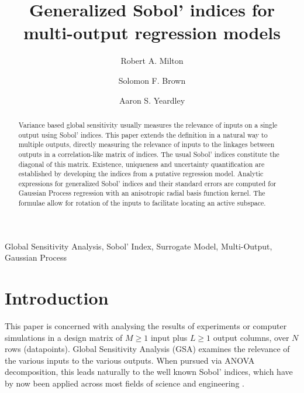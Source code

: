 \documentclass[preprint,12pt]{elsarticle}
\begin{document}
\begin{frontmatter}

    \title{Generalized Sobol' indices for multi-output regression models}

    \author{Robert A. Milton}

    \author{Solomon F. Brown}

    \author{Aaron S. Yeardley}

    \address{Department of Chemical and Biological Engineering, University of Sheffield, Sheffield, S1 3JD, United Kingdom}       

    \begin{abstract}
        Variance based global sensitivity usually measures the relevance of inputs on a single output using Sobol' indices. This paper extends the definition in a natural way to multiple outputs, directly measuring the relevance of inputs to the linkages between outputs in a correlation-like matrix of indices. The usual Sobol' indices constitute the diagonal of this matrix. Existence, uniqueness and uncertainty quantification are established by developing the indices from a putative regression model. Analytic expressions for generalized Sobol' indices and their standard errors are computed for Gaussian Process regression with an anisotropic radial basis function kernel. The formulae allow for rotation of the inputs to facilitate locating an active subspace.
    \end{abstract}

    \begin{keyword}
        Global Sensitivity Analysis, Sobol' Index, Surrogate Model, Multi-Output, Gaussian Process
    \end{keyword}

\end{frontmatter}

\section{Introduction}\label{sec:Intro}
    This paper is concerned with analysing the results of experiments or computer simulations in a design matrix of $M\geq 1$ input plus $L\geq 1$ output columns, over $N$ rows (datapoints). Global Sensitivity Analysis (GSA) \cite{Razavi2021} examines the relevance of the various inputs to the various outputs. When pursued via ANOVA decomposition, this leads naturally to the well known Sobol' indices, which have by now been applied across most fields of science and engineering \cite{Saltelli2019,Ghanem2017}. 
\end{document}
